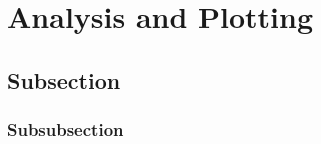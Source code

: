 
%
%

\section{Analysis and Plotting}
\label{sec:analysis}





\subsection{Subsection}
\label{subsec:analysis_subsection}



\subsubsection{Subsubsection}
\label{subsubsec:analysis_subsubsection}





